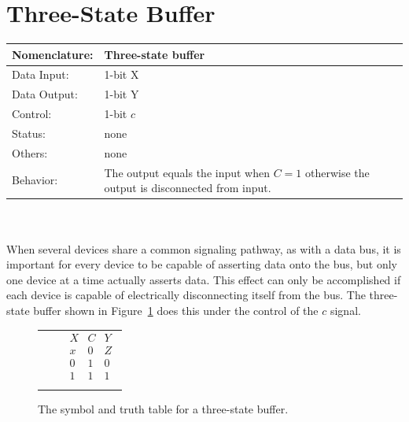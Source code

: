 \section{Three-State Buffer}
\begin{tabular}{|l|p{3.5in}|} \hline
Nomenclature:  & Three-state buffer	\\ \hline
Data Input:    & 1-bit X		\\ \hline
Data Output:   & 1-bit Y		\\ \hline
Control:       & 1-bit $c$              \\ \hline
Status:        & none			\\ \hline
Others:        & none			\\ \hline
Behavior:      & The output equals the input when 
		$C=1$ otherwise the output is 
		disconnected from input. \\ \hline                                                                               
\end{tabular}
\label{page:tsb}
\\ \\
When several devices share a common signaling pathway, as with
a data bus, it is important for every device to be capable of 
asserting data onto the bus, but only one device at a time
actually asserts data.  This effect can only be accomplished if each
device is capable of electrically disconnecting itself from the
bus.  The three-state buffer shown in Figure~\ref{fig:tsb} does
this under the control of the $c$ signal.
                                                                                
\begin{figure}[ht]
\begin{tabular}[b]{p{1.0in}p{0.5in}l}
\includegraphics[10mm,10mm][12mm,12mm]{./Fig4/tsb} & &
                                                                                
$\begin{array}{c|c||c}
X & C & Y \\ \hline
x & 0 & Z \\ \hline
0 & 1 & 0 \\ \hline
1 & 1 & 1 \\
\end{array}$
\end{tabular}
\caption{The symbol and truth table for a three-state buffer.}
\label{fig:tsb}
\end{figure}

